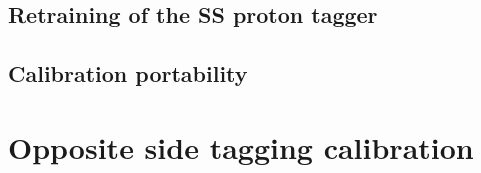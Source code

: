 \subsection{Retraining of the SS proton tagger}
\label{sec:retrainSSproton}

\subsection{Calibration portability}

\section{Opposite side tagging calibration}
\label{sec:OScalibration}

